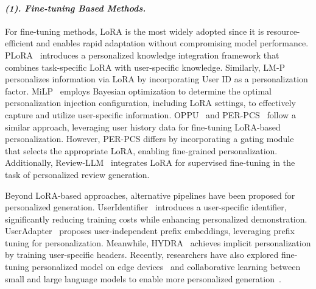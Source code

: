 \paragraph{\textbf{\textit{{(1). Fine-tuning Based Methods.}}}}
For fine-tuning methods, LoRA is the most widely adopted since it is resource-efficient and enables rapid adaptation without compromising model performance. PLoRA~\cite{zhang2024personalized} introduces a personalized knowledge integration framework that combines task-specific LoRA with user-specific knowledge. Similarly, LM-P~\cite{wozniak2024personalized} personalizes information via LoRA by incorporating User ID as a personalization factor. MiLP~\cite{zhang2024personalized} employs Bayesian optimization to determine the optimal personalization injection configuration, including LoRA settings, to effectively capture and utilize user-specific information. OPPU~\cite{tan2025democratizing} and PER-PCS~\cite{tan2024personalized} follow a similar approach, leveraging user history data for fine-tuning LoRA-based personalization. However, PER-PCS differs by incorporating a gating module that selects the appropriate LoRA, enabling fine-grained personalization. Additionally, Review-LLM~\cite{peng2024reviewllm} integrates LoRA for supervised fine-tuning in the task of personalized review generation.

Beyond LoRA-based approaches, alternative pipelines have been proposed for personalized generation. UserIdentifier~\cite{mireshghallah2021useridentifier} introduces a user-specific identifier, significantly reducing training costs while enhancing personalized demonstration. UserAdapter~\cite{zhong2021useradapter} proposes user-independent prefix embeddings, leveraging prefix tuning for personalization. Meanwhile, HYDRA~\cite{zhuang2406hydra} achieves implicit personalization by training user-specific headers. Recently, researchers have also explored fine-tuning personalized model on edge devices~\cite{peng2024pocketllm} and collaborative learning between small and large language models to enable more personalized generation~\cite{zhang2024cogenesis}.

